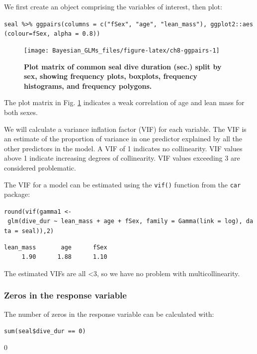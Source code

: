 \documentclass[
]{book}
\begin{document}
We first create an object comprising the variables of interest, then plot:

\texttt{seal\ \%\textgreater{}\%\ ggpairs(columns\ =\ c("fSex",\ "age",\ "lean\_mass"),\ ggplot2::aes(colour=fSex,\ alpha\ =\ 0.8))}



\begin{figure}

{\centering \texttt{[image: Bayesian\_GLMs\_files/figure-latex/ch8-ggpairs-1]} 

}

\caption{\textbf{Plot matrix of common seal dive duration (sec.) split by sex, showing frequency plots, boxplots, frequency histograms, and frequency polygons.}}\label{fig:ch8-ggpairs}
\end{figure}

The plot matrix in Fig. \ref{fig:ch8-ggpairs} indicates a weak correlation of age and lean mass for both sexes.

We will calculate a variance inflation factor (VIF) for each variable. The VIF is an estimate of the proportion of variance in one predictor explained by all the other predictors in the model. A VIF of 1 indicates no collinearity. VIF values above 1 indicate increasing degrees of collinearity. VIF values exceeding 3 are considered problematic.

The VIF for a model can be estimated using the \texttt{vif()} function from the \texttt{car} package:

\texttt{round(vif(gamma1\ \textless{}-\ glm(dive\_dur\ \textasciitilde{}\ lean\_mass\ +\ age\ +\ fSex,\ family\ =\ Gamma(link\ =\ log),\ data\ =\ seal)),2)}

\begin{verbatim}
lean_mass       age      fSex 
     1.90      1.88      1.10 
\end{verbatim}

The estimated VIFs are all \textless3, so we have no problem with multicollinearity.

\hypertarget{gamma-zeros}{%
\subsubsection{Zeros in the response variable}\label{gamma-zeros}}

The number of zeros in the response variable can be calculated with:

\texttt{sum(seal\$dive\_dur\ ==\ 0)}

0
\end{document}
